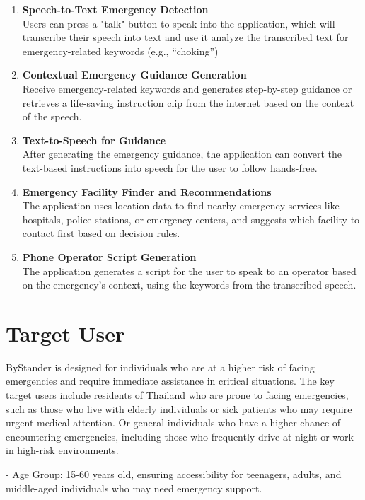 \begin{enumerate}[leftmargin=80pt]
    \item \textbf{Speech-to-Text Emergency Detection} \\
    Users can press a "talk" button to speak into the application, which will transcribe their speech into text and use it analyze the transcribed text for emergency-related keywords (e.g., “choking”)
    \item \textbf{Contextual Emergency Guidance Generation} \\
    Receive emergency-related keywords and generates step-by-step guidance or retrieves a life-saving instruction clip from the internet based on the context of the speech.
    \item \textbf{Text-to-Speech for Guidance} \\
    After generating the emergency guidance, the application can convert the text-based instructions into speech for the user to follow hands-free.
    \item \textbf{Emergency Facility Finder and Recommendations} \\
    The application uses location data to find nearby emergency services like hospitals, police stations, or emergency centers, and suggests which facility to contact first based on decision rules.
    \item \textbf{Phone Operator Script Generation} \\
    The application generates a script for the user to speak to an operator based on the emergency's context, using the keywords from the transcribed speech.
\end{enumerate}

\section{Target User}
\label{section:target-user}

ByStander is designed for individuals who are at a higher risk of facing emergencies and require immediate assistance in critical situations. The key target users include residents of Thailand who are prone to facing emergencies, such as those who live with elderly individuals or sick patients who may require urgent medical attention. Or general individuals who have a higher chance of encountering emergencies, including those who frequently drive at night or work in high-risk environments.

- Age Group: 15-60 years old, ensuring accessibility for teenagers, adults, and middle-aged individuals who may need emergency support.

